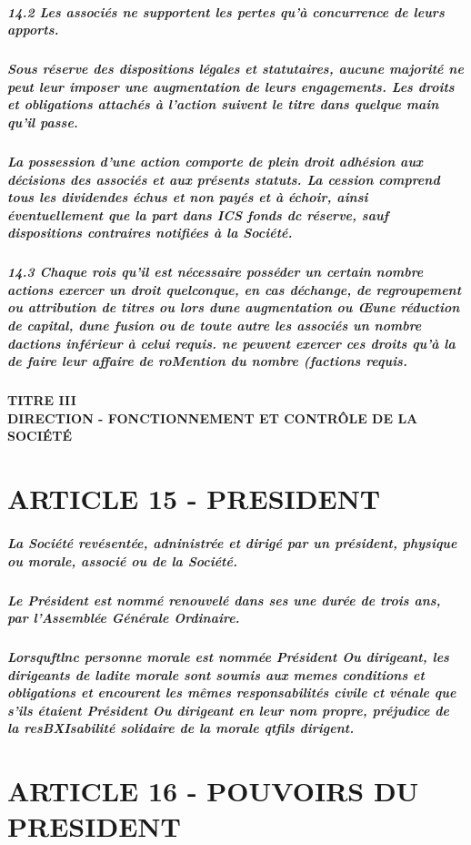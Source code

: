 \documentclass[a4paper, 11pt]{article}
\begin{document}
\subparagraph{
  14.2 Les associés ne supportent les pertes qu'à concurrence de leurs apports.
}

\subparagraph{
  Sous réserve des dispositions légales et statutaires, aucune majorité ne peut leur imposer une augmentation de leurs engagements. Les droits et obligations attachés à l'action suivent le titre dans quelque main qu'il passe.
}

\subparagraph{
  La possession d'une action comporte de plein droit adhésion aux décisions des associés et aux présents statuts. La cession comprend tous les dividendes échus et non payés et à échoir, ainsi éventuellement que la part dans ICS fonds dc réserve, sauf dispositions contraires notifiées à la Société.
}

\subparagraph{
  14.3 Chaque rois qu'il est nécessaire posséder un certain nombre actions exercer un droit quelconque, en cas déchange, de regroupement ou attribution de titres ou lors dune augmentation ou Œune réduction de capital, dune fusion ou de toute autre les associés un nombre dactions inférieur à celui requis. ne peuvent exercer ces droits qu'à la de faire leur affaire de roMention du nombre (factions requis.
}

\paragraph{
  TITRE III\\
  DIRECTION - FONCTIONNEMENT ET CONTRÔLE DE LA SOCIÉTÉ
}

\section*{ARTICLE 15 - PRESIDENT}

\subparagraph{
  La Société revésentée, adninistrée et dirigé par un président, physique ou morale, associé ou de la Société.
}

\subparagraph{
  Le Président est nommé renouvelé dans ses une durée de trois ans, par l'Assemblée Générale Ordinaire.
}

\subparagraph{
  Lorsquftlnc personne morale est nommée Président Ou dirigeant, les dirigeants de ladite morale sont soumis aux memes conditions et obligations et encourent les mêmes responsabilités civile ct vénale que s'ils étaient Président Ou dirigeant en leur nom propre, préjudice de la resBXIsabilité solidaire de la morale qtfils dirigent.
}

\section*{ARTICLE 16 - POUVOIRS DU PRESIDENT}
\end{document}
